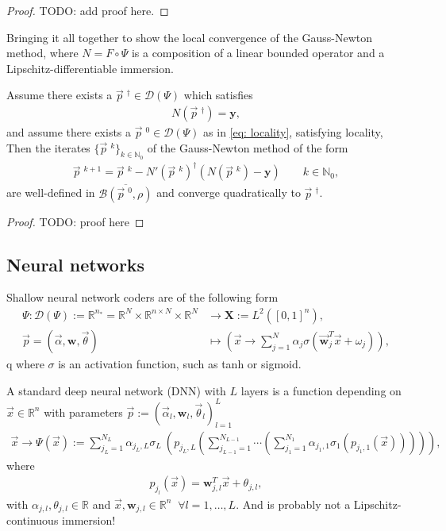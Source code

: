 \begin{proof}
    TODO: add proof here.
\end{proof}
Bringing it all together to show the local convergence of the Gauss-Newton
method, where $N = F\circ \Psi$ is a composition of a linear bounded operator
and a Lipschitz-differentiable immersion.
\begin{theorem}
    Assume there exists a $\vec{p}\;^{\dagger} \in \mathcal{D}(\Psi)$ which
    satisfies
    \begin{align}
        N(\vec{p}\;^{\dagger}) = \mathbf{y},
    \end{align}
    and assume there exists a $\vec{p}\;^{0} \in \mathcal{D}(\Psi)$ as in
    \ref{eq: locality}, satisfying locality, Then the iterates
    $\{\vec{p}\;^{k}\}_{k\in \mathbb{N}_0}$  of the Gauss-Newton method of
    the form
     \begin{align}
         \vec{p}\;^{k+1} = \vec{p}\;^{k} - N'(\vec{p}\;^{k})^{\dagger}\left(
         N\left(\vec{p}\;^{k}  \right) - \mathbf{y} \right)  \qquad k \in
         \mathbb{N}_0,
     \end{align}
     are well-defined in $\overline{\mathcal{B}\left(\vec{p}\;^{0}, \rho
     \right) }$ and converge quadratically to $\vec{p}\;^{\dagger}$.
\end{theorem}
\begin{proof}
    TODO: proof here
\end{proof}


\subsection{Neural networks}
Shallow neural network coders are of the following form
\begin{align}
    \Psi:
    \mathcal{D}(\Psi) := \mathbb{R}^{n_*} =
    \mathbb{R}^{N}\times \mathbb{R}^{n \times N}
    \times \mathbb{R}^{N}
    &\to \mathbf{X} :=
    L^{2}\left([0, 1]^{n}\right),\\
    \vec{p} = (\vec{\alpha}, \mathbf{w}, \vec{\theta}) &\mapsto
    \left(\vec{x} \to \sum_{j=1}^{N} \alpha_j\sigma\left(
    \vec{\mathbf{w}}_j^{T}\vec{x} + \omega_j \right)  \right),
\end{align}q
where $\sigma$ is an activation function, such as tanh or sigmoid.

A standard deep neural network (DNN) with $L$ layers is a function depending on $\vec{x} \in
\mathbb{R}^{n}$ with parameters $\vec{p}:=\left( \vec{\alpha}_l,
\mathbf{w}_l, \vec{\theta}_l  \right)_{l=1}^{L}$
\begin{align}
    \vec{x}\to\Psi(\vec{x}) := \sum_{j_L=1}^{N_L} \alpha_{j_L,L}\sigma_L\
    \left( p_{j_L, L} \left( \sum_{j_{L-1}=1}^{N_{L-1}}\cdots
    \left( \sum_{j_1=1}^{N_1}\alpha_{j_1,1}\sigma_1\left(p_{j_1,1}(\vec{x})
    \right)  \right)  \right)  \right),
\end{align}
where
\begin{align}
    p_{j_l}(\vec{x}) = \mathbf{w}_{j, l}^{T}\vec{x} + \theta_{j,l},
\end{align}
with $\alpha_{j,l}, \theta_{j,l} \in \mathbb{R}$ and $\vec{x},
\mathbf{w}_{j,l} \in \mathbb{R}^{n} \;\; \forall l=1,\ldots,L$. And is
probably not a Lipschitz-continuous immersion!


